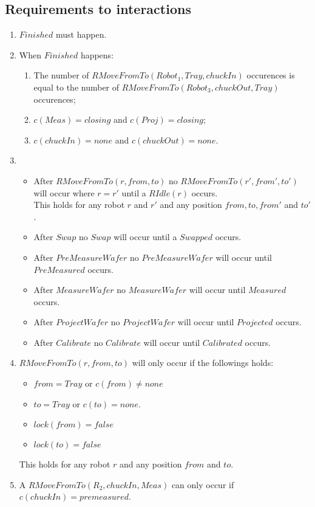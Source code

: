\subsection{Requirements to interactions}

\begin{enumerate}
	\item $Finished$ must happen.
	\item When $Finished$ happens:
	\begin{enumerate}
	\item The number of $RMoveFromTo(Robot_1, Tray, chuckIn)$ occurences is equal to the number of $RMoveFromTo(Robot_3, chuckOut, Tray)$ occurences;
	\item $c(Meas) = closing$ and $c(Proj) = closing$;
	\item $c(chuckIn) = none$ and $c(chuckOut) = none$.
	\end{enumerate}
	\item 
		\begin{itemize}
			\item After $RMoveFromTo(r, from, to)$ no $RMoveFromTo(r', from', to')$ will occur where $r=r'$ until a $RIdle(r)$ occurs. \\This holds for any robot $r$ and $r'$ and any position $from, to, from'$ and $to'$.
			\item After $Swap$ no $Swap$ will occur until a $Swapped$ occurs.
			\item After $PreMeasureWafer$ no $PreMeasureWafer$ will occur until $PreMeasured$ occurs.
			\item After $MeasureWafer$ no $MeasureWafer$ will occur until $Measured$ occurs.
			\item After $ProjectWafer$ no $ProjectWafer$ will occur until $Projected$ occurs.
			\item After $Calibrate$ no $Calibrate$ will occur until $Calibrated$ occurs.
		\end{itemize}
	\item $RMoveFromTo(r, from, to)$ will only occur if the followings holds:
	\begin{itemize}
	\item $from = Tray$ or $c(from) \neq none$
	\item $to = Tray$ or $c(to) = none$.
	\item $lock(from)= false$
	\item $lock(to) = false$
	\end{itemize}
	This holds for any robot $r$ and any position $from$ and $to$.
	\item A $RMoveFromTo(R_2,chuckIn,Meas)$ can only occur if $c(chuckIn) = premeasured$.

\end{enumerate}
